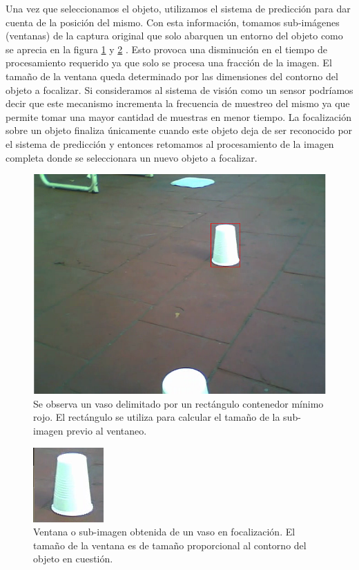 	\indent Una vez que seleccionamos el objeto, utilizamos el sistema de 
	predicción para dar cuenta de la posición del mismo. Con esta 
	información, tomamos sub-imágenes (ventanas) de la captura original 
	que solo abarquen un entorno del objeto como se aprecia en la figura 
	\ref{fig:ventaneo} y \ref{fig:ventaneo_2} . Esto provoca una 
	disminución en el tiempo de procesamiento requerido ya que solo se procesa una fracción de 
	la imagen. El tamaño de la ventana queda determinado por 
	las dimensiones del contorno del objeto a focalizar. Si consideramos 
	al sistema de visión como un sensor podríamos decir que este 
	mecanismo incrementa la frecuencia de muestreo del mismo ya que 
	permite tomar una mayor cantidad de muestras en menor tiempo. La 
	focalización sobre un objeto finaliza únicamente cuando este objeto 
	deja de ser reconocido por el sistema de predicción y entonces 
	retomamos al  procesamiento de la imagen completa donde se 
	seleccionara un nuevo objeto a focalizar. 

\begin{figure}[htpb]
\begin{center}
  \includegraphics[scale=0.4]{figuras/ventana-1.png}
\end{center}
  \caption{\small Se observa un vaso delimitado por un rectángulo 
  contenedor mínimo rojo. El rectángulo se utiliza para calcular el 
  tamaño de la sub-imagen previo al ventaneo.}
  \label{fig:ventaneo}
\end{figure}


\begin{figure}[htpb]
\begin{center}
  \includegraphics[scale=0.6]{figuras/ventana-2.png}
\end{center}
  \caption{\small Ventana o sub-imagen obtenida de un vaso en 
  focalización. El tamaño de la ventana es de tamaño proporcional al 
  contorno del objeto en cuestión.}
  \label{fig:ventaneo_2}
\end{figure}

